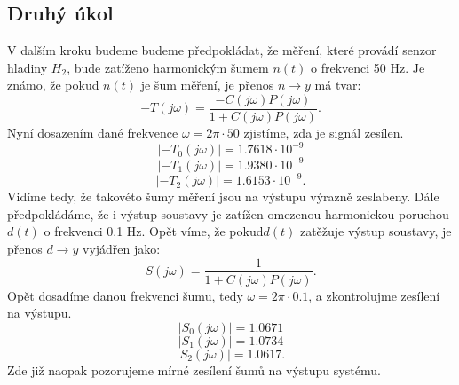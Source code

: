 \documentclass[a4paper,11pt]{article}
\begin{document}
\newpage 
\subsection{Druhý úkol}\label{sec:2_2} 
V dalším kroku budeme budeme předpokládat, že měření, které provádí senzor hladiny $ H_{2} $, bude zatíženo harmonickým šumem $ n\left ( t \right ) $ o frekvenci 50 Hz. Je známo, že pokud $ n\left ( t \right ) $ je šum měření, je přenos $ n\rightarrow y $ má tvar:
\begin{equation}
-T\left ( j\omega  \right ) = \frac{-C\left ( j\omega  \right )P\left (j\omega  \right )}{1+ C\left ( j\omega  \right )P\left ( j\omega  \right )}.
\end{equation}
Nyní dosazením dané frekvence $ \omega = 2\pi \cdot 50 $ zjistíme, zda je signál zesílen.
$$ \left | -T_{0}\left ( j\omega  \right ) \right | = 1.7618\cdot 10^{-9}$$
$$ \left | -T_{1}\left ( j\omega  \right ) \right | = 1.9380\cdot 10^{-9}$$
$$ \left | -T_{2}\left ( j\omega  \right ) \right | = 1.6153\cdot 10^{-9}.$$
Vidíme tedy, že takovéto šumy měření jsou na výstupu výrazně zeslabeny.
Dále předpokládáme, že i výstup soustavy je zatížen omezenou harmonickou poruchou $ d\left ( t \right ) $ o frekvenci 0.1 Hz. Opět víme, že pokud$ d\left ( t \right ) $ zatěžuje výstup soustavy, je přenos $ d\rightarrow y $ vyjádřen jako:
\begin{equation}
S\left ( j\omega  \right ) = \frac{1}{1+ C\left ( j\omega  \right )P\left ( j\omega  \right )}.
\end{equation}
Opět dosadíme danou frekvenci šumu, tedy $ \omega = 2\pi \cdot 0.1 $, a zkontrolujme zesílení na výstupu.
$$ \left | S_{0}\left ( j\omega  \right ) \right | = 1.0671 $$
$$ \left | S_{1}\left ( j\omega  \right ) \right | = 1.0734 $$
$$ \left | S_{2}\left ( j\omega  \right ) \right | = 1.0617.$$
Zde již naopak pozorujeme mírné zesílení
šumů na výstupu systému.
\end{document}
